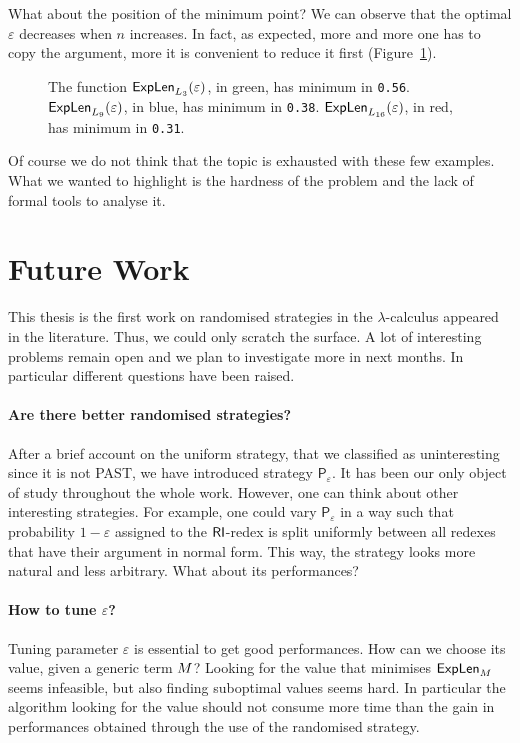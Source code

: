 What about the position of the minimum point? We can observe that the optimal $\varepsilon$ decreases when $n$ increases. In fact, as expected, more and more one has to copy the argument, more it is convenient to reduce it first (Figure~\ref{figure:plot3}).
\begin{figure}
		\caption[The function $\explen{\termthree_3}(\varepsilon)$.]{The function $\explen{\termthree_3}(\varepsilon)$, in green, has minimum in \texttt{0.56}. $\textsf{ExpLen}_{L_9}(\varepsilon)$, in blue, has minimum in \texttt{0.38}. $\textsf{ExpLen}_{L_{16}}(\varepsilon)$, in red, has minimum in \texttt{0.31}.}
		\label{figure:plot3}
	\end{figure}
	 Of course we do not think that the topic is exhausted with these few examples. What we wanted to highlight is the hardness of the problem and the lack of formal tools to analyse it.
\section{Future Work}
This thesis is the first work on randomised strategies in the $\lambda$-calculus appeared in the literature. Thus, we could only scratch the surface. A lot of interesting problems remain open and we plan to investigate more in next months. In particular different questions have been raised.
\paragraph{Are there better randomised strategies?} After a brief account on the uniform strategy, that we classified as uninteresting since it is not PAST, we have introduced strategy $\mathsf{P}_\varepsilon$. It has been our only object of study throughout the whole work. However, one can think about other interesting strategies. For example, one could vary $\mathsf{P}_\varepsilon$ in a way such that probability $1-\varepsilon$ assigned to the $\textsf{RI}$-redex is split uniformly between all redexes that have their argument in normal form. This way, the strategy looks more natural and less arbitrary. What about its performances?
\paragraph{How to tune $\varepsilon$?} Tuning parameter $\varepsilon$ is essential to get good performances. How can we choose its value, given a generic term $M$? Looking for the value that minimises $\textsf{ExpLen}_{M}$ seems infeasible, but also finding suboptimal values seems hard. In particular the algorithm looking for the value should not consume more time than the gain in performances obtained through the use of the randomised strategy.
